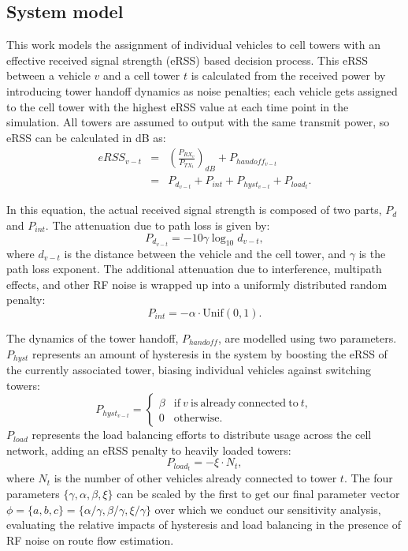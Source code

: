 \documentclass[twocolumn,10pt]{article}
\begin{document}
\subsection{System model}
This work models the assignment of individual vehicles to cell towers with an effective received signal strength (eRSS) based decision process.  This eRSS between a vehicle $v$ and a cell tower $t$ is calculated from the received power by introducing tower handoff dynamics as noise penalties;
each vehicle gets assigned to the cell tower with the highest eRSS value at each time point in the simulation.
All towers are assumed to output with the same transmit power, so eRSS can be calculated in dB as: \begin{eqnarray}
  eRSS_{v-t} & = & \left( \frac{P_{RX_v}}{P_{TX_t}} \right)_{dB} 
                   + P_{handoff_{v-t}} \\
  & = & P_{d_{v-t}} +P_{int} + P_{hyst_{v-t}} + P_{load_t}.
\end{eqnarray}

In this equation, the actual received signal strength is composed of two parts, $P_d$ and $P_{int}$.  The attenuation due to path loss is given by: \begin{equation}
  P_{d_{v-t}} = -10 \gamma \log_{10} d_{v-t},
\end{equation}
where $d_{v-t}$ is the distance between the vehicle and the cell tower, and $\gamma$ is the path loss exponent.  The additional attenuation due to interference, multipath effects, and other RF noise is wrapped up into a uniformly distributed random penalty: \begin{equation}
  P_{int} = -\alpha \cdot \mathrm{Unif}(0,1).
\end{equation}

The dynamics of the tower handoff, $P_{handoff}$, are modelled using two parameters.  $P_{hyst}$ represents an amount of hysteresis in the system by boosting the eRSS of the currently associated tower, biasing individual vehicles against switching towers: \begin{equation}
  P_{hyst_{v-t}} = \begin{cases}
    \beta & \mathrm{if~} v \mathrm{~is~already~connected~to~} t, \\
    0 & \mathrm{otherwise.}
  \end{cases}
\end{equation}
$P_{load}$ represents the load balancing efforts to distribute usage across the cell network, adding an eRSS penalty to heavily loaded towers: \begin{equation}
  P_{load_t} = -\xi \cdot N_{t},
\end{equation}
where $N_t$ is the number of other vehicles already connected to tower $t$.  The four parameters $\{\gamma, \alpha, \beta, \xi\}$ can be scaled by the first to get our final parameter vector $\phi = \{a, b, c\} = \{\alpha/\gamma, \beta/\gamma, \xi/\gamma\}$ over which we conduct our sensitivity analysis, evaluating the relative impacts of hysteresis and load balancing in the presence of RF noise on route flow estimation.
\end{document}

